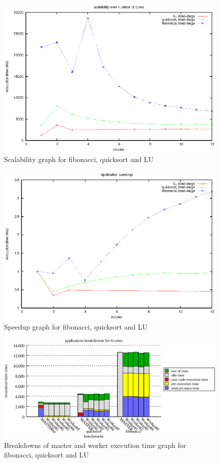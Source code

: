 \begin{figure}[!ht]
\includegraphics[width=0.7\columnwidth]{figures/apps_scalability}
\caption{Scalability graph for fibonacci, quicksort and LU}
\label{fig:apps_scalability}
\end{figure}

\begin{figure}[!ht]
\includegraphics[width=0.7\columnwidth]{figures/apps_speedup}
\caption{Speedup graph for fibonacci, quicksort and LU}
\label{fig:apps_speedup}
\end{figure}

\begin{figure}[!ht]
\includegraphics[width=\columnwidth]{figures/app_breakdowns_6cores}
\caption{Breakdowns of master and worker execution time graph for fibonacci, quicksort and LU}
\label{fig:app_breakdowns_6cores}
\end{figure}

